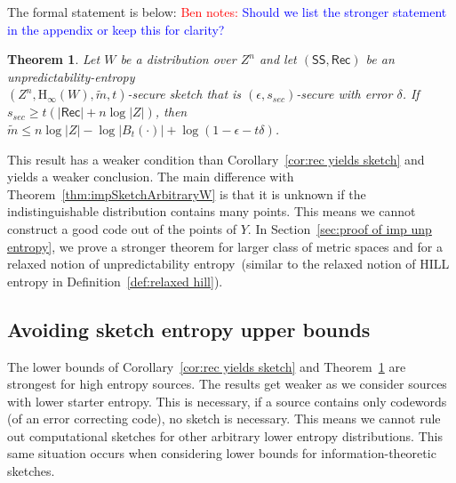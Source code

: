 \documentclass[11pt]{article}
\newcommand{\secref}[1]{\mbox{Section~\ref{#1}}}
\newcommand{\thref}[1]{\mbox{Theorem~\ref{#1}}}
\newcommand{\defref}[1]{\mbox{Definition~\ref{#1}}}
\newcommand{\corref}[1]{\mbox{Corollary~\ref{#1}}}
\newcommand{\class}[1]{{\ensuremath{\mathsf{#1}}}}
\newcommand{\sketch}{\ensuremath{\class{SS}}\xspace}
\newcommand{\rec}{\ensuremath{\class{Rec}}\xspace}
\newcommand{\Hoo}{\mathrm{H}_\infty}
\newtheorem{theorem}{Theorem}[section]
\newcommand{\authnote}[2]{{\textcolor{red}{\textsf{#1 notes: }\textcolor{blue}{ #2}}\marginpar{\textcolor{red}{\textbf{!!!!!}}}}}
\newcommand{\authnote}[2]{}
\newcommand{\bnote}[1]{{\authnote{Ben}{#1}}}
\begin{document}
The formal statement is below:
\bnote{Should we list the stronger statement in the appendix or keep this for clarity?}
\begin{theorem}
\label{thm:imp of unp entropy}
Let $W$ be a distribution over $Z^n$ and let $(\sketch, \rec)$ be an unpredictability-entropy \\$(Z^n, \Hoo(W), \tilde{m}, t)$-secure sketch that is $(\epsilon, s_{sec})$-secure with error $\delta$.  If $s_{sec} \geq t(|\rec|+n\log |Z|)$, then $\tilde{m}\leq n\log |Z| - \log |B_t(\cdot)| + \log(1-\epsilon -t\delta)$.
\end{theorem}
This result has a weaker condition than \corref{cor:rec yields sketch} and yields a weaker conclusion.  The main difference with \thref{thm:impSketchArbitraryW} is that it is unknown if the indistinguishable distribution contains many points.  This means we cannot construct a good code out of the points of $Y$.  In \secref{sec:proof of imp unp entropy}, we prove a stronger theorem for larger class of metric spaces and for a relaxed notion of unpredictability entropy~(similar to the relaxed notion of HILL entropy in \defref{def:relaxed hill}).%

\subsection{Avoiding sketch entropy upper bounds}
\label{ssec:avoiding bounds}

The lower bounds of \corref{cor:rec yields sketch} and \thref{thm:imp of unp entropy} are strongest for high entropy sources.  The results get weaker as we consider sources with lower starter entropy.  This is necessary, if a source contains only codewords (of an error correcting code), no sketch is necessary.  This means we cannot rule out computational sketches for other arbitrary lower entropy distributions.  This same situation occurs when considering lower bounds for information-theoretic sketches.
\end{document}
